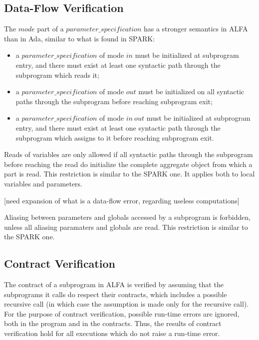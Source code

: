 \documentclass{article}
\newcommand{\bnf}[1]{$\mathit{#1}$}
\begin{document}
\subsection{Data-Flow Verification}

The \bnf{mode} part of a \bnf{parameter\_specification} has a stronger
semantics in ALFA than in Ada, similar to what is found in SPARK:
\begin{itemize}
\item a \bnf{parameter\_specification} of mode \bnf{in} must be initialized at
  subprogram entry, and there must exist at least one syntactic path through
  the subprogram which reads it;
\item a \bnf{parameter\_specification} of mode \bnf{out} must be initialized on
  all syntactic paths through the subprogram before reaching subprogram exit;
\item a \bnf{parameter\_specification} of mode \bnf{in\ out} must be initialized
  at subprogram entry, and there must exist at least one syntactic path through
  the subprogram which assigns to it before reaching subprogram exit.
\end{itemize}

Reads of variables are only allowed if all syntactic paths through the
subprogram before reaching the read do initialize the complete aggregate object
from which a part is read. This restriction is similar to the SPARK one. It
applies both to local variables and parameters.

[need expansion of what is a data-flow error, regarding useless computations]

Aliasing between parameters and globals accessed by a subprogram is forbidden,
unless all aliasing paramaters and globals are read. This restriction is
similar to the SPARK one.

\subsection{Contract Verification}

The contract of a subprogram in ALFA is verified by assuming that the
subprograms it calls do respect their contracts, which includes a possible
recursive call (in which case the assumption is made only for the recursive
call). For the purpose of contract verification, possible run-time errors are
ignored, both in the program and in the contracts. Thus, the results of
contract verification hold for all executions which do not raise a run-time
error.
\end{document}
